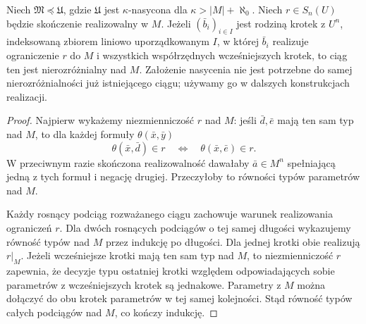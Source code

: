 \begin{lemat}
\label{lem:mod-coheir-indiscernible}
Niech $\mathfrak M\preccurlyeq\mathfrak U$,
gdzie $\mathfrak U$ jest $\kappa$-nasycona
dla $\kappa>|M|+\aleph_0$.
Niech $r\in S_n(U)$ będzie skończenie
realizowalny w $M$. Jeżeli $(\bar b_i)_{i\in I}$
jest rodziną krotek z $U^n$, indeksowaną
zbiorem liniowo uporządkowanym $I$, w której
$\bar b_i$ realizuje ograniczenie $r$ do
$M$ i wszystkich współrzędnych wcześniejszych
krotek, to ciąg ten jest nierozróżnialny nad $M$.
Założenie nasycenia nie jest potrzebne do samej
nierozróżnialności już istniejącego ciągu;
używamy go w dalszych konstrukcjach realizacji.
\end{lemat}
\begin{proof}
Najpierw wykażemy niezmienniczość $r$ nad $M$:
jeśli $\bar d,\bar e$ mają ten sam typ nad $M$,
to dla każdej formuły $\theta(\bar x,\bar y)$
\[
\theta(\bar x,\bar d)\in r
\quad\Longleftrightarrow\quad
\theta(\bar x,\bar e)\in r.
\]
W przeciwnym razie skończona realizowalność
dawałaby $\bar a\in M^n$ spełniającą jedną
z tych formuł i negację drugiej.
Przeczyłoby to równości typów parametrów nad $M$.

Każdy rosnący podciąg rozważanego ciągu
zachowuje warunek realizowania ograniczeń $r$.
Dla dwóch rosnących podciągów o tej samej
długości wykazujemy równość typów nad $M$
przez indukcję po długości.
Dla jednej krotki obie realizują $r|_M$.
Jeżeli wcześniejsze krotki mają ten sam typ
nad $M$, to niezmienniczość $r$ zapewnia,
że decyzje typu ostatniej krotki względem
odpowiadających sobie parametrów z wcześniejszych
krotek są jednakowe. Parametry z $M$ można
dołączyć do obu krotek parametrów w tej samej
kolejności. Stąd równość typów całych podciągów
nad $M$, co kończy indukcję.
\end{proof}

